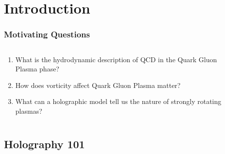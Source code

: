 \documentclass[aspectratio=169, xcolor=dvipsnames]{beamer}
\title[Exploring Holographic QCD]{}
\author{Markus A.G. Amano}
\date{April 2nd, 2024}
\subtitle{\href{https://inspirehep.net/literature/2690368}{ arXiv:2308.11686 (Amano, Kaminski et al. 2023) }
}
\institute{Yamagata University}
\begin{document}
{
  
}

\maketitle

\section{Introduction}

\begin{frame}
  \frametitle{Motivating Questions}

  \begin{columns}[c]
    \begin{column}{0.5\paperwidth}
      \begin{enumerate}
        \item What is the hydrodynamic description of QCD in the Quark Gluon Plasma phase?
        \item How does vorticity affect Quark Gluon Plasma matter?
        \item What can a holographic model tell us the nature of strongly rotating plasmas?
      \end{enumerate}
    \end{column}
    \begin{column}{0.5\paperwidth}
    \end{column}
  \end{columns}
\end{frame}

\subsection{Holography 101}
\end{document}
